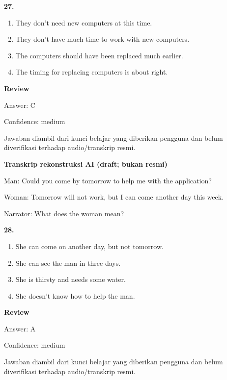 \documentclass[12pt]{article}
\begin{document}
\noindent\textbf{27.}
\begin{enumerate}[label=(\Alph*),leftmargin=*,itemsep=0.2em]
\item They don't need new computers at this time.
\item They don't have much time to work with new computers.
\item The computers should have been replaced much earlier.
\item The timing for replacing computers is about right.
\end{enumerate}
\par
\begingroup
\setlength{\parskip}{0pt}
\setlength{\parindent}{0pt}
\textbf{Review}\par
Answer: C\par
Confidence: medium\par
Jawaban diambil dari kunci belajar yang diberikan pengguna dan belum diverifikasi terhadap audio/transkrip resmi.\par
\endgroup
\par
\vspace{0.25\baselineskip}
\begin{exampleblock}
\textbf{Transkrip rekonstruksi AI (draft; bukan resmi)}\par
Man: Could you come by tomorrow to help me with the application?\par
Woman: Tomorrow will not work, but I can come another day this week.\par
Narrator: What does the woman mean?\par
\end{exampleblock}
\noindent\textbf{28.}
\begin{enumerate}[label=(\Alph*),leftmargin=*,itemsep=0.2em]
\item She can come on another day, but not tomorrow.
\item She can see the man in three days.
\item She is thirsty and needs some water.
\item She doesn't know how to help the man.
\end{enumerate}
\par
\begingroup
\setlength{\parskip}{0pt}
\setlength{\parindent}{0pt}
\textbf{Review}\par
Answer: A\par
Confidence: medium\par
Jawaban diambil dari kunci belajar yang diberikan pengguna dan belum diverifikasi terhadap audio/transkrip resmi.\par
\end{document}

